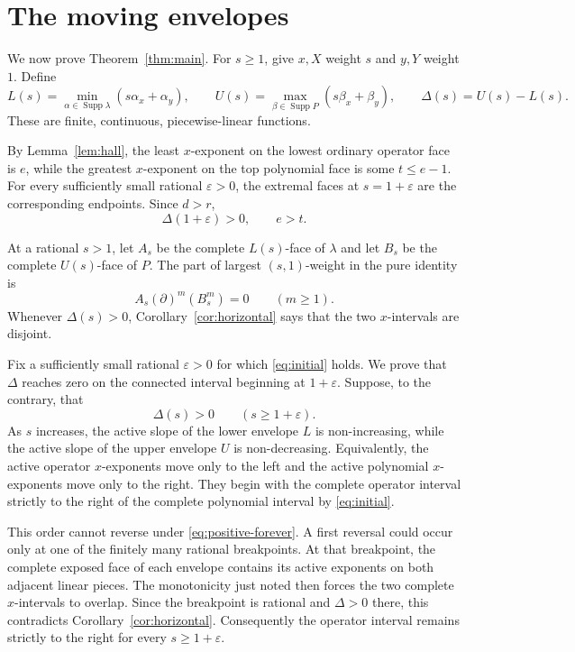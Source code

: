 \documentclass[11pt]{article}
\newcommand{\Supp}{\operatorname{Supp}}
\begin{document}
\section{The moving envelopes}

We now prove Theorem~\ref{thm:main}.  For $s\geq1$, give $x,X$ weight $s$
and $y,Y$ weight $1$.  Define
\begin{equation}\label{eq:envelopes}
 L(s)=\min_{\alpha\in\Supp\lambda}(s\alpha_x+\alpha_y),
 \qquad
 U(s)=\max_{\beta\in\Supp P}(s\beta_x+\beta_y),
 \qquad
 \Delta(s)=U(s)-L(s).
\end{equation}
These are finite, continuous, piecewise-linear functions.

By Lemma~\ref{lem:hall}, the least $x$-exponent on the lowest ordinary
operator face is $e$, while the greatest $x$-exponent on the top polynomial
face is some $t\leq e-1$.  For every sufficiently small rational
$\varepsilon>0$, the extremal faces at $s=1+\varepsilon$ are the
corresponding endpoints.  Since $d>r$,
\begin{equation}\label{eq:initial}
 \Delta(1+\varepsilon)>0,
 \qquad e>t.
\end{equation}

At a rational $s>1$, let $A_s$ be the complete $L(s)$-face of $\lambda$
and let $B_s$ be the complete $U(s)$-face of $P$.  The part of largest
$(s,1)$-weight in the pure identity is
\begin{equation}\label{eq:face-pure}
 A_s(\partial)^m(B_s^m)=0\qquad(m\geq1).
\end{equation}
Whenever $\Delta(s)>0$, Corollary~\ref{cor:horizontal} says that the two
$x$-intervals are disjoint.

Fix a sufficiently small rational $\varepsilon>0$ for which
\eqref{eq:initial} holds.  We prove that $\Delta$ reaches zero on the
connected interval beginning at $1+\varepsilon$.  Suppose, to the contrary,
that
\begin{equation}\label{eq:positive-forever}
 \Delta(s)>0\qquad(s\geq1+\varepsilon).
\end{equation}
As $s$ increases, the active slope of the lower envelope $L$ is
non-increasing, while the active slope of the upper envelope $U$ is
non-decreasing.  Equivalently, the active operator $x$-exponents move only
to the left and the active polynomial $x$-exponents move only to the right.
They begin with the complete operator interval strictly to the right of the
complete polynomial interval by \eqref{eq:initial}.

This order cannot reverse under \eqref{eq:positive-forever}.  A first
reversal could occur only at one of the finitely many rational breakpoints.
At that breakpoint, the complete exposed face of each envelope contains
its active exponents on both adjacent linear pieces.  The monotonicity just
noted then forces the two complete $x$-intervals to overlap.  Since the
breakpoint is rational and $\Delta>0$ there, this contradicts
Corollary~\ref{cor:horizontal}.  Consequently the operator interval remains
strictly to the right for every $s\geq1+\varepsilon$.
\end{document}
